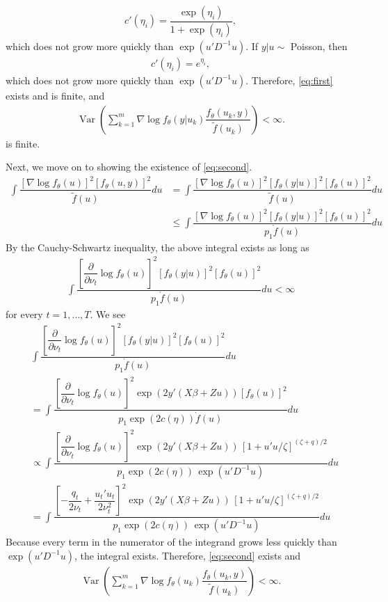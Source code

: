 \documentclass{article}
\DeclareMathOperator{\var}{Var}
\begin{document}
\begin{align}
c'(\eta_i)= \dfrac{\exp(\eta_i)}{1+\exp(\eta_i)},
\end{align}
which does not grow more quickly than $\exp(u'D^{-1}u)$. If $y|u \sim$ Poisson, then
\begin{align}
c'(\eta_i)= e^{\eta_i},
\end{align}
which does not grow more quickly than $\exp(u'D^{-1}u)$. Therefore, \eqref{eq:first} exists and is finite, and 
\begin{align}
\var \left( \sum_{k=1}^m \nabla \log f_\theta (y|u_k) \dfrac{f_\theta(u_k,y)}{\tilde{f}(u_k)} \right) < \infty.
\end{align}
is finite.

Next, we move on to showing the existence of \eqref{eq:second}.
\begin{align}
\int \dfrac{ \left[ \nabla \log f_\theta (u) \right]^2 \left[ f_\theta(u,y)\right]^2}{\tilde{f}(u)} du &= 
\int \dfrac{ \left[ \nabla \log f_\theta (u) \right]^2 \left[ f_\theta(y|u)\right]^2  \left[ f_\theta(u)\right]^2}{\tilde{f}(u)} du\\
&\leq \int \dfrac{ \left[ \nabla \log f_\theta (u) \right]^2 \left[ f_\theta(y|u)\right]^2  \left[ f_\theta(u)\right]^2}{p_1 \grave{f}(u)} du
\end{align}
By the Cauchy-Schwartz inequality, the above integral exists as long as  
\begin{align}
\int \dfrac{ \left[ \dfrac{\partial}{\partial \nu_t} \log f_\theta (u) \right]^2 \left[ f_\theta(y|u)\right]^2  \left[ f_\theta(u)\right]^2}{p_1 \grave{f}(u)} du < \infty
\end{align}
for every $t=1,\ldots, T$. We see
\begin{align}
&\int \dfrac{ \left[ \dfrac{\partial}{\partial \nu_t} \log f_\theta (u) \right]^2 \left[ f_\theta(y|u)\right]^2  \left[ f_\theta(u)\right]^2}{p_1 \grave{f}(u)} du \\
&= \int \dfrac{ \left[ \dfrac{\partial}{\partial \nu_t} \log f_\theta (u) \right]^2 \exp(2y'(X\beta+Zu)   )  \left[ f_\theta(u)\right]^2}{p_1 \exp(2c(\eta))    \grave{f}(u)} du \\
&\propto \int \dfrac{ \left[ \dfrac{\partial}{\partial \nu_t} \log f_\theta (u) \right]^2 \exp(2y'(X\beta+Zu)   ) \,   \left[ 1+u'u/\zeta  \right]^{(\zeta+q)/2} }{p_1 \exp(2c(\eta)) \, \exp(u'D^{-1}u)  } du\\
&= \int \dfrac{ \left[  -\dfrac{q_t}{2 \nu_t} + \dfrac{u_t'u_t}{2 \nu_t^2}   \right]^2 \exp(2y'(X\beta+Zu)   ) \,   \left[ 1+u'u/\zeta  \right]^{(\zeta+q)/2} }{p_1 \exp(2c(\eta)) \, \exp(u'D^{-1}u)  } du
\end{align}
Because every term in the numerator of the integrand grows less quickly than $\exp(u'D^{-1}u)$, the integral exists.  Therefore, \eqref{eq:second} exists and 
\begin{align}
\var \left(\sum_{k=1}^m \nabla \log f_\theta (u_k) \dfrac{f_\theta(u_k,y)}{\tilde{f}(u_k)} \right) < \infty.
\end{align}
\end{document}
